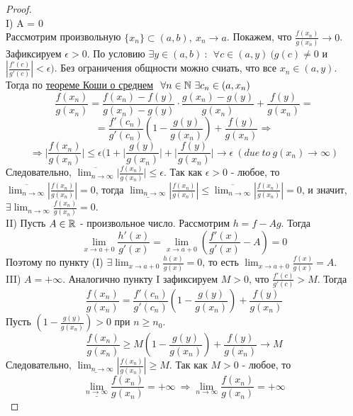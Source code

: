 \begin{proof} \ \\
    I) A = 0\\
    Рассмотрим произвольную $\{x_n\} \subset (a, b), \ x_n \to a$.
    Покажем, что $\frac{f(x_n)}{g(x_n)} \to 0$. Зафиксируем $\epsilon > 0$.
    По условию $\exists y \in (a, b) \ : \ \ \forall c \in (a, y) \ (g(c) \neq 0$ и $|\frac{f'(c)}{g'(c)}| < \epsilon)$.
    Без ограничения общности можно счиать, что все $x_n \in (a, y)$.
    Тогда по \hyperlink{koshi_o_srednem}{теореме Коши о среднем} $\ \forall n \in \mathbb{N} \ \exists c_n \in (a, x_n)$
    \[\frac{f(x_n)}{g(x_n)} = \frac{f(x_n)-f(y)}{g(x_n)-g(y)} \cdot \frac{g(x_n)-g(y)}{g(x_n)} + \frac{f(y)}{g(x_n)} =\] 
    \[= \frac{f'(c_n)}{g'(c_n)}(1-\frac{g(y)}{g(x_n)}) + \frac{f(y)}{g(x_n)} \Rightarrow\]
    \[\Rightarrow \lvert\frac{f(x_n)}{g(x_n)}\rvert \leq \epsilon(1+\lvert\frac{g(y)}{g(x_n)}\rvert + \lvert\frac{f(y)}{g(x_n)}\rvert \to \epsilon \ (due \  to \ g(x_n) \to \infty)\]
    Следовательно, $\overline{\lim_{n \to \infty}} \lvert\frac{f(x_n)}{g(x_n)}\rvert \leq \epsilon$.
    Так как $\epsilon > 0$ - любое, то $\overline{\lim_{n \to \infty}} |\frac{f(x_n)}{g(x_n)}| = 0$,
    тогда $\underline{\lim_{n \to \infty}} |\frac{f(x_n)}{g(x_n)}| \leq \overline{\lim_{n \to \infty}} |\frac{f(x_n)}{g(x_n)}| = 0$,
    и значит, $\exists \lim_{n \to \infty} \frac{f(x_n)}{g(x_n)} = 0$.\\
    II) Пусть $A \in \mathbb{R}$ - произвольное число. Рассмотрим $h = f - Ag$.
    Тогда \[\lim_{x \to a+0} \frac{h'(x)}{g'(x)} = \lim_{x \to a+0} (\frac{f'(x)}{g'(x)} - A) = 0\]
    Поэтому по пункту (I) $\exists \lim_{x\to a+0} \frac{h(x)}{g(x)} = 0$, то есть $\lim_{x\to a+0} \frac{f(x)}{g(x)} = A$.\\
    III) $A = +\infty$. Аналогично пункту I зафиксируем $M > 0$, что $\frac{f'(c)}{g'(c)} > M$.
    Тогда \[\frac{f(x_n)}{g(x_n)} = \frac{f'(c_n)}{g'(c_n)}(1-\frac{g(y)}{g(x_n)}) + \frac{f(y)}{g(x_n)}\]
    Пусть $(1-\frac{g(y)}{g(x_n)}) > 0$ при $n \geq n_0$.
    \[\frac{f(x_n)}{g(x_n)} \geq M(1-\frac{g(y)}{g(x_n)}) + \frac{f(y)}{g(x_n)} \to M\]
    Следовательно, $\underline{\lim_{n \to \infty}} |\frac{f(x_n)}{g(x_n)}| \geq M$.
    Так как $M > 0$ - любое, то \[\underline{\lim_{n \to \infty}} \frac{f(x_n)}{g(x_n)} = +\infty\ \Rightarrow \lim_{n \to \infty} \frac{f(x_n)}{g(x_n)} = +\infty\]
\end{proof}